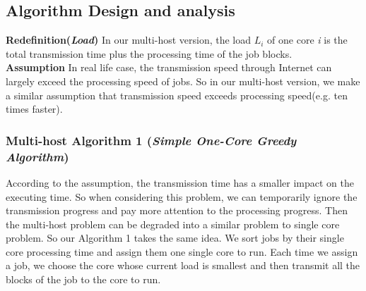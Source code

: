 \documentclass{article}
\begin{document}
\subsection{Algorithm Design and analysis}
    \textbf{Redefinition(\textit{Load})} In our multi-host version, the load $L_i$ of one core \textit{i} is the total transmission time plus the processing time of the job blocks.\\
    
    \textbf{Assumption} In real life case, the transmission speed through Internet can largely exceed the processing speed of jobs. So in our multi-host version, we make a similar assumption that transmission speed exceeds processing speed(e.g. ten times faster).\\
    
    \subsubsection{Multi-host Algorithm 1 (\textit{Simple One-Core Greedy Algorithm})} According to the assumption, the transmission time has a smaller impact on the executing time. So when considering this problem, we can temporarily ignore the transmission progress and pay more attention to the processing progress. Then the multi-host problem can be degraded into a similar problem to single core problem. So our Algorithm 1 takes the same idea. We sort jobs by their single core processing time and assign them one single core to run. Each time we assign a job, we choose the core whose current load is smallest and then transmit all the blocks of the job to the core to run.\\
    
\end{document}
